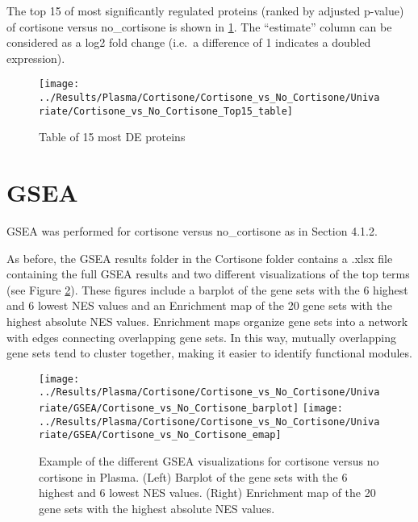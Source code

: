\documentclass[
]{book}
\begin{document}
The top 15 of most significantly regulated proteins (ranked by adjusted p-value) of cortisone versus no\_cortisone is shown in \ref{fig:top15Cort}. The ``estimate'' column can be considered as a log2 fold change (i.e.~a difference of 1 indicates a doubled expression).

\begin{figure}

{\centering \texttt{[image: ../Results/Plasma/Cortisone/Cortisone\_vs\_No\_Cortisone/Univariate/Cortisone\_vs\_No\_Cortisone\_Top15\_table]} 

}

\caption{Table of 15 most DE proteins}\label{fig:top15Cort}
\end{figure}

\hypertarget{gsea-1}{%
\section{GSEA}\label{gsea-1}}

GSEA was performed for cortisone versus no\_cortisone as in Section 4.1.2.

As before, the GSEA results folder in the Cortisone folder contains a .xlsx file containing the full GSEA results and two different visualizations of the top terms (see Figure \ref{fig:gseaPlotsCort}). These figures include a barplot of the gene sets with the 6 highest and 6 lowest NES values and an Enrichment map of the 20 gene sets with the highest absolute NES values. Enrichment maps organize gene sets into a network with edges connecting overlapping gene sets. In this way, mutually overlapping gene sets tend to cluster together, making it easier to identify functional modules.

\begin{figure}

{\centering \texttt{[image: ../Results/Plasma/Cortisone/Cortisone\_vs\_No\_Cortisone/Univariate/GSEA/Cortisone\_vs\_No\_Cortisone\_barplot]} \texttt{[image: ../Results/Plasma/Cortisone/Cortisone\_vs\_No\_Cortisone/Univariate/GSEA/Cortisone\_vs\_No\_Cortisone\_emap]} 

}

\caption{Example of the different GSEA visualizations for cortisone versus no cortisone in Plasma. (Left)  Barplot of the gene sets with the 6 highest and 6 lowest NES values. (Right) Enrichment map of the 20 gene sets with the highest absolute NES values.}\label{fig:gseaPlotsCort}
\end{figure}
\end{document}
